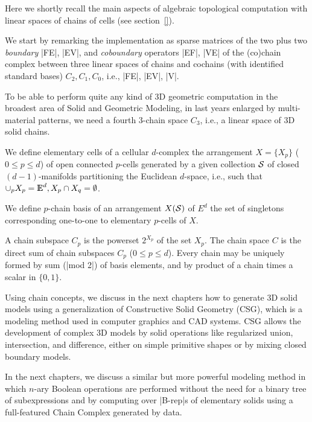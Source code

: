 \begin{coding}[Algebraic computation of FE = $\delta_1$]
Here we shortly recall the main aspects of algebraic topological computation with linear spaces of chains of cells (see section~\ref{}).

We start by remarking the implementation as sparse matrices of the two plus two \emph{boundary} |FE|, |EV|, and \emph{coboundary} operators |EF|, |VE| of the (co)chain complex between three linear spaces of chains and cochains (with identified standard bases) $C_2, C_1, C_0$, i.e., |FE|, |EV|, |V|.

To be able to perform quite any kind of 3D geometric computation in the broadest area of Solid and Geometric Modeling, in last years enlarged by multi-material patterns, we need a fourth 3-chain space $C_3$, i.e., a linear space of 3D solid chains.

\begin{definition}
We define elementary cells of a cellular $d$-complex the arrangement $X=\{X_p\}$ ($0\leq p\leq d$) of open connected $p$-cells generated by a given collection ${\cal S}$ of closed $(d-1)$-manifolds partitioning the Euclidean $d$-space, i.e., such that $\cup_p X_p = \mathbb{I\!\!E}^d,  X_p \cap X_q = \emptyset$.
\end{definition}

\begin{definition}
We define $p$-chain basis of an arrangement $X({\cal S})$ of $E^d$ the set of singletons corresponding one-to-one to elementary $p$-cells of $X$. 
\end{definition}

\begin{remark}
A chain subspace $C_p$ is the powerset $\mathcal{2}^{X_p}$ of the set $X_p$. The chain space $C$ is the direct sum of chain subspaces $C_p$ ($0\leq p\leq d$). Every chain may be uniquely formed by sum (|mod 2|) of basis elements, and by product of a chain times a scalar in $\{0,1\}$.
\end{remark}


Using chain concepts, we discuss in the next chapters how to generate 3D solid models using a generalization of Constructive Solid Geometry (CSG), which is a modeling method used in computer graphics and CAD systems. CSG allows the development of complex 3D models by solid operations like regularized union, intersection, and difference, either on simple primitive shapes or by mixing closed boundary models.

In the next chapters, we discuss a similar but more powerful modeling method in which $n$-ary Boolean operations are performed without the need for a binary tree of subexpressions and by computing over |B-rep|s of elementary solids using a full-featured Chain Complex generated by data.


\end{coding}

